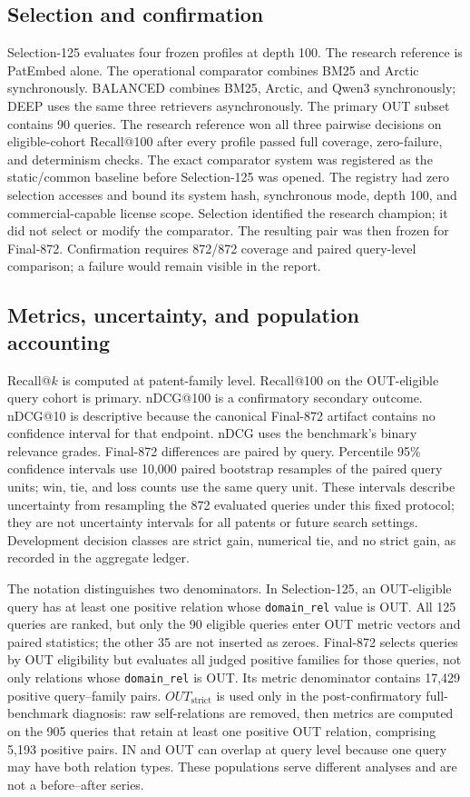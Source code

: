 \documentclass[final,5p,times,twocolumn]{elsarticle}
\begin{document}
\subsection{Selection and confirmation}

Selection-125 evaluates four frozen profiles at depth 100. The research
reference is PatEmbed alone. The operational comparator combines BM25 and Arctic synchronously.
BALANCED combines BM25, Arctic, and Qwen3 synchronously; DEEP uses the same
three retrievers asynchronously. The primary OUT subset contains 90 queries.
The research reference won all three pairwise decisions on eligible-cohort Recall@100
after every profile passed full coverage, zero-failure, and determinism checks.
The exact comparator system was registered as the static/common baseline before
Selection-125 was opened. The registry had zero selection accesses and bound
its system hash, synchronous mode, depth 100, and commercial-capable license
scope. Selection identified the research champion; it did not select or modify
the comparator. The resulting pair was then frozen for Final-872.
Confirmation requires 872/872 coverage and paired query-level comparison; a
failure would remain visible in the report.

\subsection{Metrics, uncertainty, and population accounting}

Recall@\(k\) is computed at patent-family level. Recall@100 on the
OUT-eligible query cohort is primary.
nDCG@100 is a confirmatory secondary outcome. nDCG@10 is descriptive because
the canonical Final-872 artifact contains no confidence interval for that
endpoint. nDCG uses the benchmark's binary relevance grades. Final-872
differences are paired by query. Percentile 95\% confidence intervals use
10,000 paired bootstrap resamples of the paired query units; win, tie, and
loss counts use the same query unit. These intervals describe uncertainty from
resampling the 872 evaluated queries under this fixed protocol; they are not
uncertainty intervals for all patents or future search settings. Development decision classes are strict
gain, numerical tie, and no strict gain, as recorded in the aggregate ledger.

The notation distinguishes two denominators. In Selection-125, an OUT-eligible
query has at least one positive relation whose \texttt{domain\_rel} value is
OUT. All 125 queries are ranked, but only the 90 eligible queries enter OUT
metric vectors and paired statistics; the other 35 are not inserted as zeroes.
Final-872 selects queries by OUT eligibility but evaluates all judged positive
families for those queries, not only relations whose \texttt{domain\_rel} is
OUT. Its metric denominator contains 17,429 positive query--family pairs.
\(OUT_{\mathrm{strict}}\) is used only in the
post-confirmatory full-benchmark diagnosis: raw self-relations are removed,
then metrics are computed on the 905 queries that retain at least one positive
OUT relation, comprising 5,193 positive pairs. IN and OUT can overlap at query
level because one query may have both relation types. These populations serve
different analyses and are not a before--after series.
\end{document}
